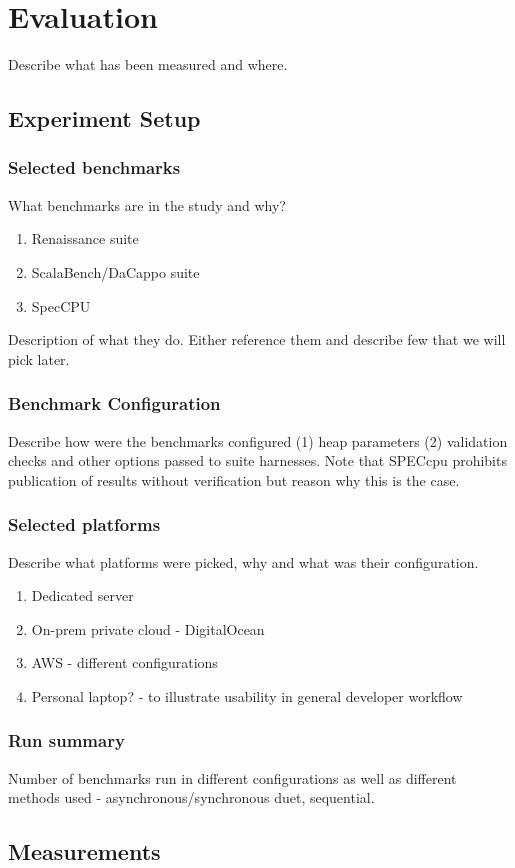 \chapter{Evaluation}
\label{chap:evaluation}

Describe what has been measured and where.

\section{Experiment Setup}
\label{sec:experiment_setup}

\subsection{Selected benchmarks}

What benchmarks are in the study and why?

\begin{enumerate}
  \item Renaissance suite
  \item ScalaBench/DaCappo suite
  \item SpecCPU
\end{enumerate}

Description of what they do. Either reference them and describe few that we will pick later.

\subsection{Benchmark Configuration}
\label{sec:benchmark_configuration}

Describe how were the benchmarks configured (1) heap parameters (2) validation checks and other options passed to suite harnesses.
Note that SPECcpu prohibits publication of results without verification but reason why this is the case.

\subsection{Selected platforms}

Describe what platforms were picked, why and what was their configuration.
\begin{enumerate}
  \item Dedicated server
  \item On-prem private cloud - DigitalOcean
  \item AWS - different configurations
  \item Personal laptop? - to illustrate usability in general developer workflow
\end{enumerate}

\subsection{Run summary}

Number of benchmarks run in different configurations as well as different methods used - asynchronous/synchronous duet, sequential.

\section{Measurements}

